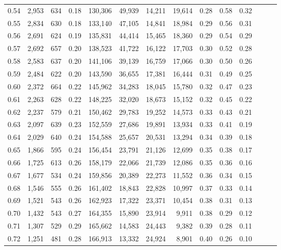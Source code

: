 \begin{tabular}{rrrrrrrrrrrrrr}
0.54 &  2,953 &  634 &  0.18 &  130,306 &   49,939 &  14,211 &  19,614 &  0.28 &  0.58 &      0.32 \\
0.55 &  2,834 &  630 &  0.18 &  133,140 &   47,105 &  14,841 &  18,984 &  0.29 &  0.56 &      0.31 \\
0.56 &  2,691 &  624 &  0.19 &  135,831 &   44,414 &  15,465 &  18,360 &  0.29 &  0.54 &      0.29 \\
0.57 &  2,692 &  657 &  0.20 &  138,523 &   41,722 &  16,122 &  17,703 &  0.30 &  0.52 &      0.28 \\
0.58 &  2,583 &  637 &  0.20 &  141,106 &   39,139 &  16,759 &  17,066 &  0.30 &  0.50 &      0.26 \\
0.59 &  2,484 &  622 &  0.20 &  143,590 &   36,655 &  17,381 &  16,444 &  0.31 &  0.49 &      0.25 \\
0.60 &  2,372 &  664 &  0.22 &  145,962 &   34,283 &  18,045 &  15,780 &  0.32 &  0.47 &      0.23 \\
0.61 &  2,263 &  628 &  0.22 &  148,225 &   32,020 &  18,673 &  15,152 &  0.32 &  0.45 &      0.22 \\
0.62 &  2,237 &  579 &  0.21 &  150,462 &   29,783 &  19,252 &  14,573 &  0.33 &  0.43 &      0.21 \\
0.63 &  2,097 &  639 &  0.23 &  152,559 &   27,686 &  19,891 &  13,934 &  0.33 &  0.41 &      0.19 \\
0.64 &  2,029 &  640 &  0.24 &  154,588 &   25,657 &  20,531 &  13,294 &  0.34 &  0.39 &      0.18 \\
0.65 &  1,866 &  595 &  0.24 &  156,454 &   23,791 &  21,126 &  12,699 &  0.35 &  0.38 &      0.17 \\
0.66 &  1,725 &  613 &  0.26 &  158,179 &   22,066 &  21,739 &  12,086 &  0.35 &  0.36 &      0.16 \\
0.67 &  1,677 &  534 &  0.24 &  159,856 &   20,389 &  22,273 &  11,552 &  0.36 &  0.34 &      0.15 \\
0.68 &  1,546 &  555 &  0.26 &  161,402 &   18,843 &  22,828 &  10,997 &  0.37 &  0.33 &      0.14 \\
0.69 &  1,521 &  543 &  0.26 &  162,923 &   17,322 &  23,371 &  10,454 &  0.38 &  0.31 &      0.13 \\
0.70 &  1,432 &  543 &  0.27 &  164,355 &   15,890 &  23,914 &   9,911 &  0.38 &  0.29 &      0.12 \\
0.71 &  1,307 &  529 &  0.29 &  165,662 &   14,583 &  24,443 &   9,382 &  0.39 &  0.28 &      0.11 \\
0.72 &  1,251 &  481 &  0.28 &  166,913 &   13,332 &  24,924 &   8,901 &  0.40 &  0.26 &      0.10 \\

\end{tabular}
